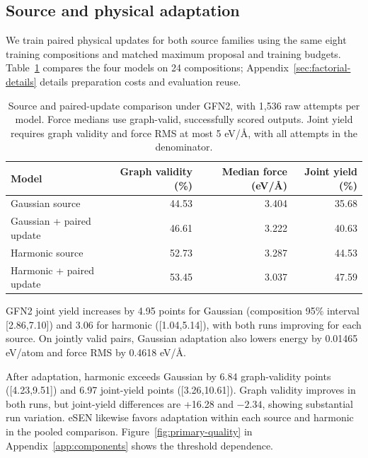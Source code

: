 \subsection{Source and physical adaptation}\label{sec:absolute-quality}
We train paired physical updates for both source families using the same eight training compositions and matched maximum proposal and training budgets. Table~\ref{tab:absolute-quality} compares the four models on 24 compositions; Appendix~\ref{sec:factorial-details} details preparation costs and evaluation reuse.

\begin{table}[t]
\centering
\caption{Source and paired-update comparison under GFN2, with 1,536 raw attempts per model. Force medians use graph-valid, successfully scored outputs. Joint yield requires graph validity and force RMS at most 5 eV/\AA, with all attempts in the denominator.}
\small
\begin{tabular}{lrrr}
\toprule
Model & Graph validity (\%) & Median force (eV/\AA) & Joint yield (\%)\\
\midrule
Gaussian source &44.53&3.404&35.68\\
Gaussian + paired update &46.61&3.222&40.63\\
Harmonic source &52.73&3.287&44.53\\
Harmonic + paired update &53.45&3.037&47.59\\
\bottomrule
\end{tabular}\label{tab:absolute-quality}
\end{table}

GFN2 joint yield increases by 4.95 points for Gaussian (composition 95\% interval [2.86,7.10]) and 3.06 for harmonic ([1.04,5.14]), with both runs improving for each source. On jointly valid pairs, Gaussian adaptation also lowers energy by 0.01465 eV/atom and force RMS by 0.4618 eV/\AA.

After adaptation, harmonic exceeds Gaussian by 6.84 graph-validity points ([4.23,9.51]) and 6.97 joint-yield points ([3.26,10.61]). Graph validity improves in both runs, but joint-yield differences are +16.28 and $-2.34$, showing substantial run variation. eSEN likewise favors adaptation within each source and harmonic in the pooled comparison. Figure~\ref{fig:primary-quality} in Appendix~\ref{app:components} shows the threshold dependence.
